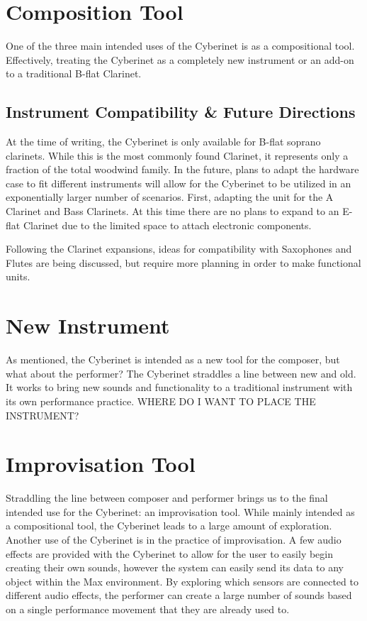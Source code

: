 \section{Composition Tool}
One of the three main intended uses of the Cyberinet is as a compositional tool. Effectively, treating the Cyberinet as a completely new instrument or an add-on to a traditional B-flat Clarinet.

\subsection{Instrument Compatibility \& Future Directions}
At the time of writing, the Cyberinet is only available for B-flat soprano clarinets. While this is the most commonly found Clarinet, it represents only a fraction of the total woodwind family. In the future, plans to adapt the hardware case to fit different instruments will allow for the Cyberinet to be utilized in an exponentially larger number of scenarios. 
First, adapting the unit for the A Clarinet and Bass Clarinets. At this time there are no plans to expand to an E-flat Clarinet due to the limited space to attach electronic components.

Following the Clarinet expansions, ideas for compatibility with Saxophones and Flutes are being discussed, but require more planning in order to make functional units.

\section{New Instrument}

As mentioned, the Cyberinet is intended as a new tool for the composer, but what about the performer? The Cyberinet straddles a line between new and old. It works to bring new sounds and functionality to a traditional instrument with its own performance practice. WHERE DO I WANT TO PLACE THE INSTRUMENT? 

\section{Improvisation Tool}
Straddling the line between composer and performer brings us to the final intended use for the Cyberinet: an improvisation tool. While mainly intended as a compositional tool, the Cyberinet leads to a large amount of exploration. Another use of the Cyberinet is in the practice of improvisation. A few audio effects are provided with the Cyberinet to allow for the user to easily begin creating their own sounds, however the system can easily send its data to any object within the Max environment. By exploring which sensors are connected to different audio effects, the performer can create a large number of sounds based on a single performance movement that they are already used to.

